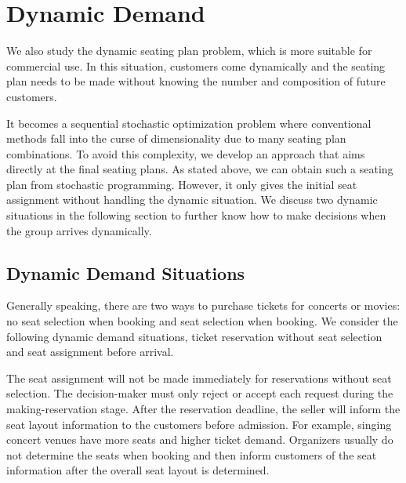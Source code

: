 \section{Dynamic Demand}\label{dynamic_demand}

We also study the dynamic seating plan problem, which is more suitable for commercial use. In this situation, customers come dynamically and the seating plan needs to be made without knowing the number and composition of future customers. 

It becomes a sequential stochastic optimization problem where conventional methods fall into the curse of dimensionality due to many seating plan combinations. To avoid this complexity, we develop an approach that aims directly at the final seating plans. As stated above, we can obtain such a seating plan from stochastic programming. However, it only gives the initial seat assignment without handling the dynamic situation. We discuss two dynamic situations in the following section to further know how to make decisions when the group arrives dynamically.


\subsection{Dynamic Demand Situations}
Generally speaking, there are two ways to purchase tickets for concerts or movies: no seat selection when booking and seat selection when booking. We consider the following dynamic demand situations, ticket reservation without seat selection and seat assignment before arrival.

The seat assignment will not be made immediately for reservations without seat selection. The decision-maker must only reject or accept each request during the making-reservation stage. After the reservation deadline, the seller will inform the seat layout information to the customers before admission. For example, singing concert venues have more seats and higher ticket demand. Organizers usually do not determine the seats when booking and then inform customers of the seat information after the overall seat layout is determined.




